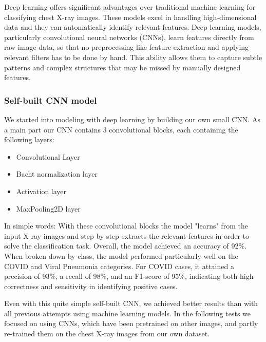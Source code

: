 \documentclass{article}
\begin{document}
Deep learning offers significant advantages over traditional machine learning for classifying chest X-ray images. These models excel in handling high-dimensional data and they can automatically identify relevant features. Deep learning models, particularly convolutional neural networks (CNNs), learn features directly from raw image data, so that no preprocessing like feature extraction and applying relevant filters has to be done by hand. This ability allows them to capture subtle patterns and complex structures that may be missed by manually designed features.


\subsubsection{Self-built CNN model} 
We started into modeling with deep learning by building our own small CNN. As a main part our CNN contains 3 convolutional blocks, each containing the following layers: 
\begin{itemize}
    \item Convolutional Layer
    \item Bacht normalization layer
    \item Activation layer
    \item MaxPooling2D layer
\end{itemize}
In simple words: With these convolutional blocks the model "learns" from the input X-ray images and step by step extracts the relevant features in order to solve the classification task. 
Overall, the model achieved an accuracy of 92\%. When broken down by class, the model performed particularly well on the COVID and Viral Pneumonia categories. For COVID cases, it attained a precision of 93\%, a recall of 98\%, and an F1-score of 95\%, indicating both high correctness and sensitivity in identifying positive cases. 

Even with this quite simple self-built CNN, we achieved better results than with all previous attempts using machine learning models. In the following tests we focused on using CNNs, which have been pretrained on other images, and partly re-trained them on the chest X-ray images from our own dataset.

\end{document}

